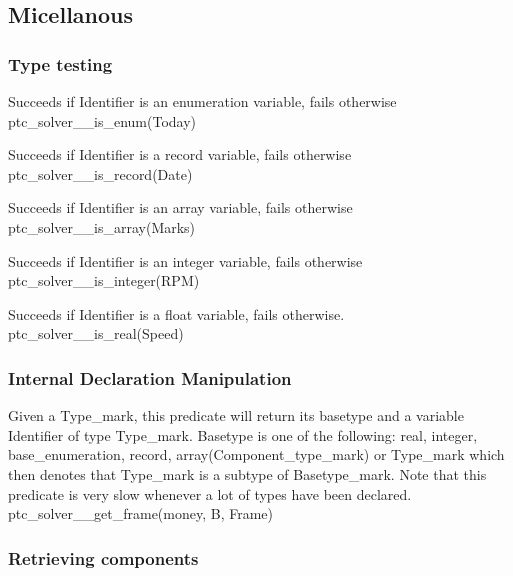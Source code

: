 \documentclass{article}
\begin{document}
\subsection{Micellanous}

\subsubsection{Type testing}

\hspace{\parindent}
    {Succeeds if Identifier is an enumeration variable, fails otherwise}
    {ptc\_solver\_\_is\_enum(Today)}
    {}

    {Succeeds if Identifier is a record variable, fails otherwise}
    {ptc\_solver\_\_is\_record(Date)}
    {}

    {Succeeds if Identifier is an array variable, fails otherwise}
    {ptc\_solver\_\_is\_array(Marks)}
    {}

    {Succeeds if Identifier is an integer variable, fails otherwise}
    {ptc\_solver\_\_is\_integer(RPM)}
    {}

    {Succeeds if Identifier is a float variable, fails otherwise.}
    {ptc\_solver\_\_is\_real(Speed)}
    {}

\subsubsection{Internal Declaration Manipulation}

\hspace{\parindent}
{Given a Type\_mark, this predicate will return its basetype and a
variable Identifier of type Type\_mark. Basetype is one of the following: real,
integer, base\_enumeration, record,
array(Component\_type\_mark) or Type\_mark which then denotes that Type\_mark is
a subtype of Basetype\_mark. Note that this predicate is very slow whenever a lot
of types have been declared.}
{ptc\_solver\_\_get\_frame(money, B, Frame)}
{}

\subsubsection{Retrieving components}
\end{document}
